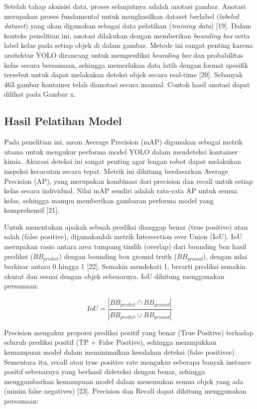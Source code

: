 Setelah tahap akuisisi data, proses selanjutnya adalah anotasi
gambar. Anotasi merupakan proses fundamental untuk menghasilkan
dataset berlabel (\textit{labeled dataset}) yang akan digunakan
sebagai data pelatihan (\textit{training data}) [19]. Dalam konteks penelitian
ini, anotasi dilakukan dengan memberikan \textit{bounding box} serta label
kelas pada setiap objek di dalam gambar. Metode ini sangat penting
karena arsitektur YOLO dirancang untuk memprediksi \textit{bounding box} dan
probabilitas kelas secara bersamaan, sehingga memerlukan data latih
dengan format spesifik tersebut untuk dapat melakukan deteksi objek
secara real-time [20]. Sebanyak 463 gambar kontainer telah dianotasi
secara manual. Contoh hasil anotasi dapat dilihat pada Gambar x.

\vspace{1em}

\subsection{Hasil Pelatihan Model}
Pada penelitian ini, mean Average Precision (mAP) digunakan sebagai
metrik utama untuk mengukur performa model YOLO dalam mendeteksi
kontainer kimia. Akurasi deteksi ini sangat penting agar lengan robot
dapat melakukan inspeksi kecacatan secara tepat. Metrik ini dihitung
berdasarkan Average Precision (AP), yang merupakan kombinasi dari
precision dan recall untuk setiap kelas secara individual. Nilai mAP
sendiri adalah rata-rata AP untuk semua kelas, sehingga mampu
memberikan gambaran performa model yang komprehensif [21]. \par

Untuk menentukan apakah sebuah prediksi dianggap benar (true
positive) atau salah (false positive), digunakanlah metrik
Intersection over Union (IoU). IoU merupakan rasio antara area
tumpang tindih (overlap) dari bounding box hasil prediksi
($BB_{predict}$) dengan
bounding box ground truth ($BB_{ground}$), dengan nilai berkisar antara
0 hingga 1 [22].
Semakin mendekati 1, berarti prediksi semakin akurat dan sesuai
dengan objek sebenarnya. IoU dihitung menggunakan persamaan:

\begin{equation}
  IoU = \frac{|BB_{predict} \cap
  BB_{ground}|}{|BB_{predict} \cup BB_{ground}|}
\end{equation}

Precision mengukur proporsi prediksi positif yang benar (True
Positive) terhadap seluruh prediksi positif (TP + False Positive),
sehingga menunjukkan kemampuan model dalam meminimalkan kesalahan
deteksi (false positives). Sementara itu, recall atau true positive
rate mengukur seberapa banyak instance positif sebenarnya yang
berhasil dideteksi dengan benar, sehingga menggambarkan kemampuan
model dalam menemukan semua objek yang ada (minim false negatives)
[23]. Precision dan Recall dapat dihitung menggunakan persamaan:

